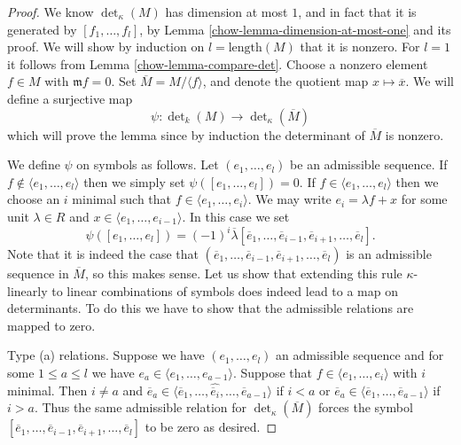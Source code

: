 \begin{proof}

We know $\det_\kappa(M)$ has dimension at most $1$, and in fact that it
is generated by $[f_1, \ldots, f_l]$, by
Lemma \ref{chow-lemma-dimension-at-most-one} and its proof.
We will show by induction on $l = \text{length}(M)$
that it is nonzero. For $l = 1$ it follows from Lemma \ref{chow-lemma-compare-det}.
Choose a nonzero element $f \in M$
with $\mathfrak m f = 0$. Set $\overline{M} = M /\langle f \rangle$,
and denote the quotient map $x \mapsto \overline{x}$.
We will define a surjective map
$$
\psi : \det\nolimits_k(M) \to \det\nolimits_\kappa(\overline{M})
$$
which will prove the lemma since by induction the determinant of
$\overline{M}$ is nonzero.

\medskip\noindent
We define $\psi$ on symbols as follows.
Let $(e_1, \ldots, e_l)$ be an admissible sequence.
If $f \not \in \langle e_1, \ldots, e_l \rangle$ then
we simply set $\psi([e_1, \ldots, e_l]) = 0$.
If $f \in \langle e_1, \ldots, e_l \rangle$ then we choose
an $i$ minimal such that $f \in \langle e_1, \ldots, e_i \rangle$.
We may write $e_i = \lambda f + x$ for some unit $\lambda \in R$
and $x \in \langle e_1, \ldots, e_{i - 1} \rangle$.
In this case we set
$$
\psi([e_1, \ldots, e_l]) =
(-1)^i
\overline{\lambda}[\overline{e}_1, \ldots,
\overline{e}_{i - 1},
\overline{e}_{i + 1}, \ldots, \overline{e}_l].
$$
Note that it is indeed the case that
$(\overline{e}_1, \ldots,
\overline{e}_{i - 1},
\overline{e}_{i + 1}, \ldots, \overline{e}_l)$
is an admissible sequence in $\overline{M}$, so this makes sense.
Let us show that extending this rule $\kappa$-linearly to
linear combinations of symbols does indeed lead to a map on
determinants. To do this we have to show that the admissible
relations are mapped to zero.

\medskip\noindent
Type (a) relations. Suppose we have $(e_1, \ldots, e_l)$ an
admissible sequence and for some $1 \leq a \leq l$ we have
$e_a \in \langle e_1, \ldots, e_{a - 1}\rangle$.
Suppose that $f \in \langle e_1, \ldots, e_i\rangle$ with $i$ minimal.
Then $i \not = a$ and
$\overline{e}_a \in \langle \overline{e}_1, \ldots,
\hat{\overline{e}_i}, \ldots, \overline{e}_{a - 1}\rangle$ if $i < a$
or
$\overline{e}_a \in \langle \overline{e}_1, \ldots,
\overline{e}_{a - 1}\rangle$ if $i > a$.
Thus the same admissible relation for $\det_\kappa(\overline{M})$ forces
the symbol $[\overline{e}_1, \ldots,
\overline{e}_{i - 1},
\overline{e}_{i + 1}, \ldots, \overline{e}_l]$
to be zero as desired.


\end{proof}
